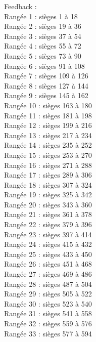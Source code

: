 ﻿\documentclass[letterpaper, 12pt]{article}
\begin{document}
Feedback : \\
Rang\'ee 1 : si\`eges 1 \`a 18\\
Rang\'ee 2 : si\`eges 19 \`a 36\\
Rang\'ee 3 : si\`eges 37 \`a 54\\
Rang\'ee 4 : si\`eges 55 \`a 72\\
Rang\'ee 5 : si\`eges 73 \`a 90\\
Rang\'ee 6 : si\`eges 91 \`a 108\\
Rang\'ee 7 : si\`eges 109 \`a 126\\
Rang\'ee 8 : si\`eges 127 \`a 144\\
Rang\'ee 9 : si\`eges 145 \`a 162\\
Rang\'ee 10 : si\`eges 163 \`a 180\\
Rang\'ee 11 : si\`eges 181 \`a 198\\
Rang\'ee 12 : si\`eges 199 \`a 216\\
Rang\'ee 13 : si\`eges 217 \`a 234\\
Rang\'ee 14 : si\`eges 235 \`a 252\\
Rang\'ee 15 : si\`eges 253 \`a 270\\
Rang\'ee 16 : si\`eges 271 \`a 288\\
Rang\'ee 17 : si\`eges 289 \`a 306\\
Rang\'ee 18 : si\`eges 307 \`a 324\\
Rang\'ee 19 : si\`eges 325 \`a 342\\
Rang\'ee 20 : si\`eges 343 \`a 360\\
Rang\'ee 21 : si\`eges 361 \`a 378\\
Rang\'ee 22 : si\`eges 379 \`a 396\\
Rang\'ee 23 : si\`eges 397 \`a 414\\
Rang\'ee 24 : si\`eges 415 \`a 432\\
Rang\'ee 25 : si\`eges 433 \`a 450\\
Rang\'ee 26 : si\`eges 451 \`a 468\\
Rang\'ee 27 : si\`eges 469 \`a 486\\
Rang\'ee 28 : si\`eges 487 \`a 504\\
Rang\'ee 29 : si\`eges 505 \`a 522\\
Rang\'ee 30 : si\`eges 523 \`a 540\\
Rang\'ee 31 : si\`eges 541 \`a 558\\
Rang\'ee 32 : si\`eges 559 \`a 576\\
Rang\'ee 33 : si\`eges 577 \`a 594\\
\end{document}
